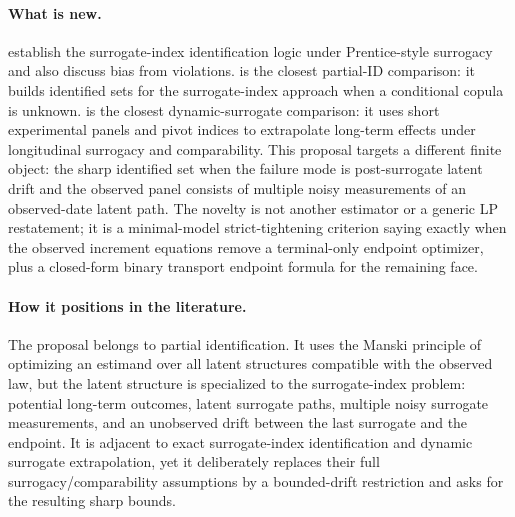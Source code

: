 \documentclass[11pt]{article}
\theoremstyle{definition}
\theoremstyle{plain}
\theoremstyle{remark}
\begin{document}
\paragraph{What is new.}
\citet{AtheyChettyImbensKang2019} establish the surrogate-index identification logic under Prentice-style surrogacy and also discuss bias from violations.  \citet{FanManzanaresParkQi2026} is the closest partial-ID comparison: it builds identified sets for the surrogate-index approach when a conditional copula is unknown.  \citet{HuangWangYuanZhaoZhang2026} is the closest dynamic-surrogate comparison: it uses short experimental panels and pivot indices to extrapolate long-term effects under longitudinal surrogacy and comparability.  This proposal targets a different finite object: the sharp identified set when the failure mode is post-surrogate latent drift and the observed panel consists of multiple noisy measurements of an observed-date latent path.  The novelty is not another estimator or a generic LP restatement; it is a minimal-model strict-tightening criterion saying exactly when the observed increment equations remove a terminal-only endpoint optimizer, plus a closed-form binary transport endpoint formula for the remaining face.

\paragraph{How it positions in the literature.}
The proposal belongs to partial identification.  It uses the Manski principle of optimizing an estimand over all latent structures compatible with the observed law, but the latent structure is specialized to the surrogate-index problem: potential long-term outcomes, latent surrogate paths, multiple noisy surrogate measurements, and an unobserved drift between the last surrogate and the endpoint.  It is adjacent to exact surrogate-index identification and dynamic surrogate extrapolation, yet it deliberately replaces their full surrogacy/comparability assumptions by a bounded-drift restriction and asks for the resulting sharp bounds.
\end{document}
